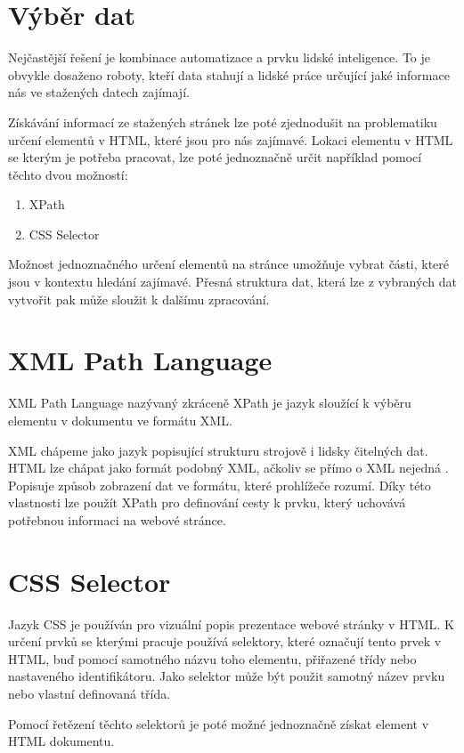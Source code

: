 \documentclass[thesis=B,czech]{FITthesis}[2012/06/26]
\begin{document}
\section{Výběr dat}
Nejčastější řešení je kombinace automatizace a prvku lidské inteligence.
To je obvykle dosaženo roboty, kteří data stahují a lidské práce určující jaké informace nás ve stažených datech zajímají.
\par
Získávání informací ze stažených stránek lze poté zjednodušit na problematiku určení elementů v HTML, které jsou pro 
nás zajímavé.
Lokaci elementu v HTML se kterým je potřeba pracovat, lze poté jednoznačně určit například pomocí těchto dvou možností:
\begin{enumerate}
\item XPath
\item CSS Selector
\end{enumerate}

Možnost jednoznačného určení elementů na stránce umožňuje vybrat části, které jsou v kontextu
hledání zajímavé.
Přesná struktura dat, která lze z vybraných dat vytvořit pak může sloužit k dalšímu zpracování.

\section{XML Path Language}
XML Path Language\cite{XPath} nazývaný zkráceně XPath je jazyk sloužící k výběru elementu v dokumentu ve formátu XML\cite{XML}.
\par
XML chápeme jako jazyk popisující strukturu strojově i lidsky čitelných dat.
HTML lze chápat jako formát podobný XML, ačkoliv se přímo o XML nejedná \cite{HTML}. 
Popisuje způsob zobrazení dat ve formátu, které prohlížeče rozumí.
Díky této vlastnosti lze použít XPath pro definování cesty k prvku, který uchovává potřebnou informaci na webové stránce.
\par
\section{CSS Selector}
Jazyk CSS je používán pro vizuální popis prezentace webové stránky v HTML. K určení prvků se kterými
pracuje používá selektory, které označují tento prvek v HTML, buď pomocí samotného názvu toho elementu, přiřazené třídy nebo nastaveného
identifikátoru. Jako selektor může být použit samotný název prvku nebo vlastní definovaná třída.\cite{CSS}
\par
Pomocí řetězení těchto selektorů je poté možné jednoznačně získat element v HTML dokumentu.
\end{document}
